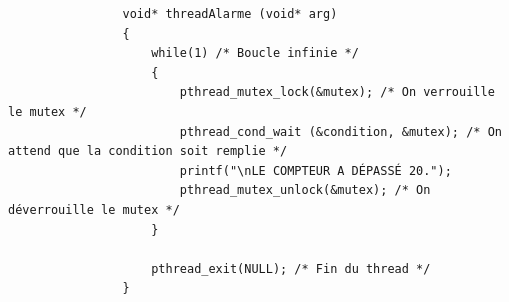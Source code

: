 		\begin{frame}[containsverbatim]
			\begin{lstlisting}
				void* threadAlarme (void* arg)
				{
					while(1) /* Boucle infinie */
					{
						pthread_mutex_lock(&mutex); /* On verrouille le mutex */
						pthread_cond_wait (&condition, &mutex); /* On attend que la condition soit remplie */
						printf("\nLE COMPTEUR A DÉPASSÉ 20."); 
						pthread_mutex_unlock(&mutex); /* On déverrouille le mutex */
					}
					
					pthread_exit(NULL); /* Fin du thread */
				}
			\end{lstlisting}
		\end{frame}

